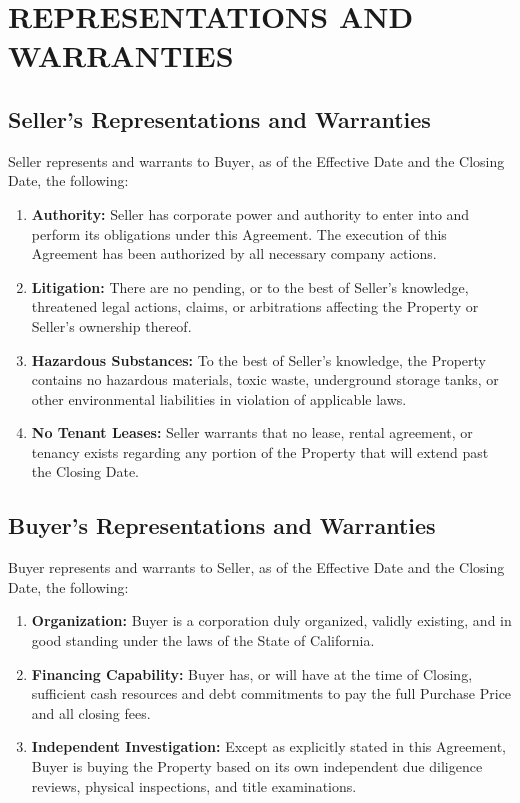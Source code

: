 \section{REPRESENTATIONS AND WARRANTIES}

\subsection{Seller's Representations and Warranties}
Seller represents and warrants to Buyer, as of the Effective Date and the Closing Date, the following:
\begin{enumerate}
    \item \textbf{Authority:} Seller has corporate power and authority to enter into and perform its obligations under this Agreement. The execution of this Agreement has been authorized by all necessary company actions.
    \item \textbf{Litigation:} There are no pending, or to the best of Seller's knowledge, threatened legal actions, claims, or arbitrations affecting the Property or Seller's ownership thereof.
    \item \textbf{Hazardous Substances:} To the best of Seller's knowledge, the Property contains no hazardous materials, toxic waste, underground storage tanks, or other environmental liabilities in violation of applicable laws.
    \item \textbf{No Tenant Leases:} Seller warrants that no lease, rental agreement, or tenancy exists regarding any portion of the Property that will extend past the Closing Date.
\end{enumerate}

\subsection{Buyer's Representations and Warranties}
Buyer represents and warrants to Seller, as of the Effective Date and the Closing Date, the following:
\begin{enumerate}
    \item \textbf{Organization:} Buyer is a corporation duly organized, validly existing, and in good standing under the laws of the State of California.
    \item \textbf{Financing Capability:} Buyer has, or will have at the time of Closing, sufficient cash resources and debt commitments to pay the full Purchase Price and all closing fees.
    \item \textbf{Independent Investigation:} Except as explicitly stated in this Agreement, Buyer is buying the Property based on its own independent due diligence reviews, physical inspections, and title examinations.
\end{enumerate}
